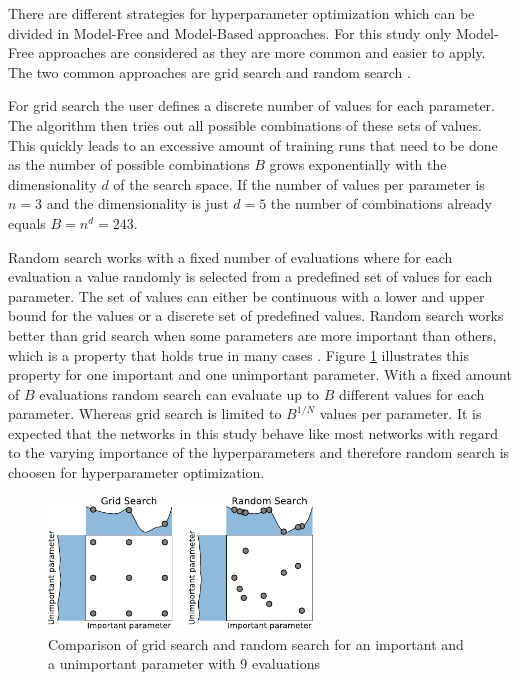 \documentclass[conference]{IEEEtran}
\begin{document}
There are different strategies for hyperparameter optimization which can be divided in Model-Free and Model-Based approaches. For this study only Model-Free approaches are considered as they are more common and easier to apply. The two common approaches are grid search and random search \cite{Feurer2019}. 

For grid search the user defines a discrete number of values for each parameter. The algorithm then tries out all possible combinations of these sets of values. This quickly leads to an excessive amount of training runs that need to be done as the number of possible combinations $ B $ grows exponentially with the dimensionality $ d $ of the search space. If the number of values per parameter is $ n = 3 $ and the dimensionality is just $ d = 5 $ the number of combinations already equals $ B = n^d = 243 $.

Random search works with a fixed number of evaluations where for each evaluation a value randomly is selected from a predefined set of values for each parameter. The set of values can either be continuous with a lower and upper bound for the values or a discrete set of predefined values. Random search works better than grid search when some parameters are more important than others, which is a property that holds true in many cases \cite{Feurer2019}. Figure \ref{fig:grid_search_random_search} illustrates this property for one important and one unimportant parameter. With a fixed amount of $ B $ evaluations random search can evaluate up to $ B $ different values for each parameter. Whereas grid search is limited to $ B^{1/N} $ values per parameter. It is expected that the networks in this study behave like most networks with regard to the varying importance of the hyperparameters and therefore random search is choosen for hyperparameter optimization.

\begin{figure}[htp]
	\centering
	\includegraphics[width=7cm]{grid_search_random_search.pdf}
	\caption{Comparison of grid search and random search for an important and a unimportant parameter with 9 evaluations \cite{Feurer2019}}
	\label{fig:grid_search_random_search}
\end{figure}
\end{document}
